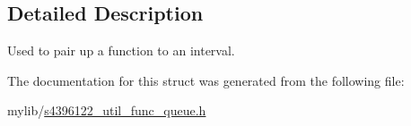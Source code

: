 \subsection{Detailed Description}
Used to pair up a function to an interval. 

The documentation for this struct was generated from the following file\+:\begin{DoxyCompactItemize}
\item 
mylib/\hyperlink{s4396122__util__func__queue_8h}{s4396122\+\_\+util\+\_\+func\+\_\+queue.\+h}\end{DoxyCompactItemize}
